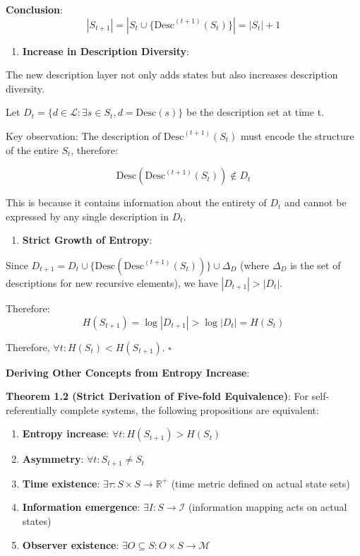   \textbf{Conclusion}:
\begin{equation}
|S_{t+1}| = |S_t \cup \{\text{Desc}^{(t+1)}(S_t)\}| = |S_t| + 1
\end{equation}

\begin{enumerate}
\item \textbf{Increase in Description Diversity}:
\end{enumerate}
  The new description layer not only adds states but also increases description diversity.
  
  Let $D_t = \{d \in \mathcal{L}: \exists s \in S_t, d = \text{Desc}(s)\}$ be the description set at time t.
  
  Key observation: The description of $\text{Desc}^{(t+1)}(S_t)$ must encode the structure of the entire $S_t$, therefore:
  
\begin{equation}
\text{Desc}(\text{Desc}^{(t+1)}(S_t)) \notin D_t
\end{equation}
  
  This is because it contains information about the entirety of $D_t$ and cannot be expressed by any single description in $D_t$.

\begin{enumerate}
\item \textbf{Strict Growth of Entropy}:
\end{enumerate}
  Since $D_{t+1} = D_t \cup \{\text{Desc}(\text{Desc}^{(t+1)}(S_t))\} \cup \Delta_D$
  (where $\Delta_D$ is the set of descriptions for new recursive elements),
  we have $|D_{t+1}| > |D_t|$.
  
  Therefore:
\begin{equation}
H(S_{t+1}) = \log |D_{t+1}| > \log |D_t| = H(S_t)
\end{equation}

Therefore, $\forall t: H(S_t) < H(S_{t+1})$. $\square$

\textbf{Deriving Other Concepts from Entropy Increase}:

\textbf{Theorem 1.2 (Strict Derivation of Five-fold Equivalence)}:
\label{thm:1.2}
For self-referentially complete systems, the following propositions are equivalent:

\begin{enumerate}
\item \textbf{Entropy increase}: $\forall t: H(S_{t+1}) > H(S_t)$
\item \textbf{Asymmetry}: $\forall t: S_{t+1} \neq S_t$
\item \textbf{Time existence}: $\exists \tau: S \times S \to \mathbb{R}^+$ (time metric defined on actual state sets)
\item \textbf{Information emergence}: $\exists I: S \to \mathcal{I}$ (information mapping acts on actual states)
\item \textbf{Observer existence}: $\exists O \subseteq S: O \times S \to \mathcal{M}$
\end{enumerate}

